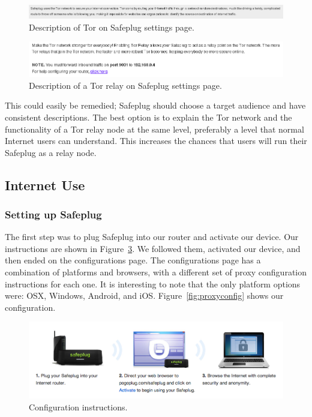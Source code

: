 \begin{figure}[th]
\begin{center}
\includegraphics[width=\textwidth]{funnydesc.png}
\caption{Description of Tor on Safeplug settings page.}
\label{fig:funnydesc}
\end{center}
\end{figure}

\begin{figure}[th]
\begin{center}
\includegraphics[width=\textwidth]{relaydesc.png}
\caption{Description of a Tor relay on Safeplug settings page.}
\label{fig:relaydesc}
\end{center}
\end{figure}

This could easily be remedied; Safeplug should choose a target audience and have consistent descriptions.  The best option is to explain the Tor network and the functionality of a Tor relay node at the same level, preferably a level that normal Internet users can understand.  This increases the chances that users will run their Safeplug as a relay node.

\subsection{Internet Use}
\label{inetuse}

\subsubsection{Setting up Safeplug} The first step was to plug Safeplug into our router and activate our device.  Our instructions are shown in Figure~\ref{fig:instructions}.  We followed them, activated our device, and then ended on the configurations page.  The configurations page has a combination of platforms and browsers, with a different set of proxy configuration instructions for each one.  It is interesting to note that the only platform options were: OSX, Windows, Android, and iOS.  Figure~\ref{fig:proxyconfig} shows our configuration. 

\begin{figure}[t]
\begin{center}
\includegraphics[width=.75\textwidth]{instructions}
\caption{Configuration instructions.}
\label{fig:instructions}
\end{center}
\end{figure}


